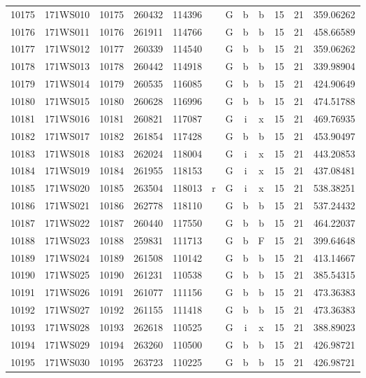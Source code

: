\begin{tabular}{|*{12}{c|}}
10175 & 171WS010 & 10175 & 260432 & 114396 &  & G & b & b & 15 & 21 & 359.06262 \\ 
10176 & 171WS011 & 10176 & 261911 & 114766 &  & G & b & b & 15 & 21 & 458.66589 \\ 
10177 & 171WS012 & 10177 & 260339 & 114540 &  & G & b & b & 15 & 21 & 359.06262 \\ 
10178 & 171WS013 & 10178 & 260442 & 114918 &  & G & b & b & 15 & 21 & 339.98904 \\ 
10179 & 171WS014 & 10179 & 260535 & 116085 &  & G & b & b & 15 & 21 & 424.90649 \\ 
10180 & 171WS015 & 10180 & 260628 & 116996 &  & G & b & b & 15 & 21 & 474.51788 \\ 
10181 & 171WS016 & 10181 & 260821 & 117087 &  & G & i & x & 15 & 21 & 469.76935 \\ 
10182 & 171WS017 & 10182 & 261854 & 117428 &  & G & b & b & 15 & 21 & 453.90497 \\ 
10183 & 171WS018 & 10183 & 262024 & 118004 &  & G & i & x & 15 & 21 & 443.20853 \\ 
10184 & 171WS019 & 10184 & 261955 & 118153 &  & G & i & x & 15 & 21 & 437.08481 \\ 
10185 & 171WS020 & 10185 & 263504 & 118013 & r & G & i & x & 15 & 21 & 538.38251 \\ 
10186 & 171WS021 & 10186 & 262778 & 118110 &  & G & b & b & 15 & 21 & 537.24432 \\ 
10187 & 171WS022 & 10187 & 260440 & 117550 &  & G & b & b & 15 & 21 & 464.22037 \\ 
10188 & 171WS023 & 10188 & 259831 & 111713 &  & G & b & F & 15 & 21 & 399.64648 \\ 
10189 & 171WS024 & 10189 & 261508 & 110142 &  & G & b & b & 15 & 21 & 413.14667 \\ 
10190 & 171WS025 & 10190 & 261231 & 110538 &  & G & b & b & 15 & 21 & 385.54315 \\ 
10191 & 171WS026 & 10191 & 261077 & 111156 &  & G & b & b & 15 & 21 & 473.36383 \\ 
10192 & 171WS027 & 10192 & 261155 & 111418 &  & G & b & b & 15 & 21 & 473.36383 \\ 
10193 & 171WS028 & 10193 & 262618 & 110525 &  & G & i & x & 15 & 21 & 388.89023 \\ 
10194 & 171WS029 & 10194 & 263260 & 110500 &  & G & b & b & 15 & 21 & 426.98721 \\ 
10195 & 171WS030 & 10195 & 263723 & 110225 &  & G & b & b & 15 & 21 & 426.98721 \\ 

\end{tabular}

